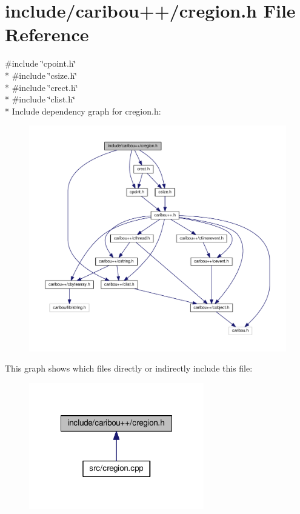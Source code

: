 \section{include/caribou++/cregion.h File Reference}
\label{cregion_8h}
{\ttfamily \#include \char`\"{}cpoint.\-h\char`\"{}}\\*
{\ttfamily \#include \char`\"{}csize.\-h\char`\"{}}\\*
{\ttfamily \#include \char`\"{}crect.\-h\char`\"{}}\\*
{\ttfamily \#include \char`\"{}clist.\-h\char`\"{}}\\*
Include dependency graph for cregion.\-h\-:\nopagebreak
\begin{figure}[H]
\begin{center}
\leavevmode
\includegraphics[width=350pt]{cregion_8h__incl}
\end{center}
\end{figure}
This graph shows which files directly or indirectly include this file\-:\nopagebreak
\begin{figure}[H]
\begin{center}
\leavevmode
\includegraphics[width=216pt]{cregion_8h__dep__incl}
\end{center}
\end{figure}
